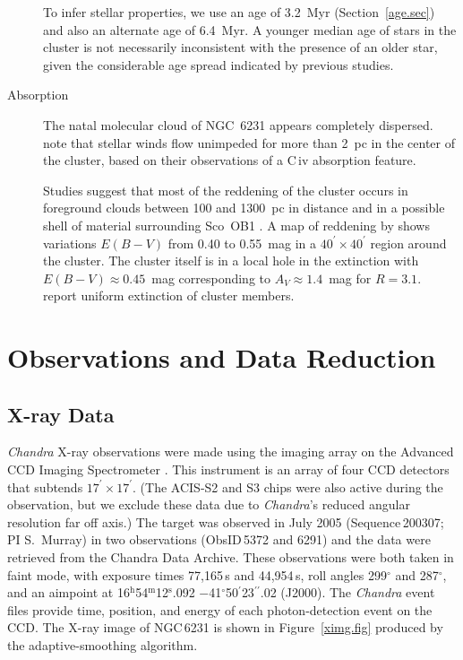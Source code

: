 \documentclass[twocolumn,tighten]{aastex61}
\newcommand{\hr}{$^\mathrm{h}$}
\newcommand{\mn}{$^\mathrm{m}$}
\newcommand{\se}{$^\mathrm{s}$}
\newcommand{\de}{$^\circ$}
\newcommand{\am}{$^\prime$}
\newcommand{\as}{$^{\prime\prime}$}
\begin{document}
\begin{description}
To infer stellar properties, we use an age of 3.2~Myr (Section~\ref{age.sec}) and also an alternate age of 6.4~Myr. A younger median age of stars in the cluster is not necessarily inconsistent with the presence of an older star, given the considerable age spread indicated by previous studies.  

\item[Absorption] The natal molecular cloud of NGC~6231 appears completely dispersed.  \citet{2017MNRAS.465.1023M} note that stellar winds flow unimpeded for more than 2~pc in the center of the cluster, based on their observations of a C\,{\sc iv} absorption feature.

Studies suggest that most of the reddening of the cluster occurs in foreground clouds between 100 and 1300~pc in distance and in a possible shell of material surrounding Sco~OB1 \citep{2006A&A...454.1047S}. A map of reddening by \citet[][their Figure~4]{2013AJ....145...37S} shows variations $E(B-V)$ from 0.40 to 0.55~mag in a $40^\prime\times40^\prime$ region around the cluster. The cluster itself is in a local hole in the extinction with $E(B-V)\approx0.45$~mag corresponding to $A_V\approx1.4$~mag for $R=3.1$.  report uniform extinction of cluster members. 

\end{description}


\section{Observations and Data Reduction \label{oanddr.sec}}

\subsection{X-ray Data\label{xraydata.sec}}

{\it Chandra} X-ray observations were made using the imaging array on the Advanced CCD Imaging Spectrometer \citep[ACIS-I;][]{2003SPIE.4851...28G}. This instrument is an array of four CCD detectors that subtends $17^\prime\times17^\prime$. (The ACIS-S2 and S3 chips were also active during the observation, but we exclude these data due to {\em Chandra}'s reduced angular resolution far off axis.)  The target was observed in July 2005 (Sequence\,200307; PI S.\ Murray) in two observations (ObsID\,5372 and 6291) and the data were retrieved from the Chandra Data Archive. These observations were both taken in faint mode, with exposure times 77,165\,s and 44,954\,s, roll angles 299$^\circ$ and 287$^\circ$, and an aimpoint at 16\hr54\mn12\se.092 $-$41\de50\am23\as.02 (J2000). The {\it Chandra} event files provide time, position, and energy of each photon-detection event on the CCD. The X-ray image of NGC\,6231 is shown in Figure~\ref{ximg.fig} produced by the \citet{2006MNRAS.368...65E} adaptive-smoothing algorithm.
\end{document}
